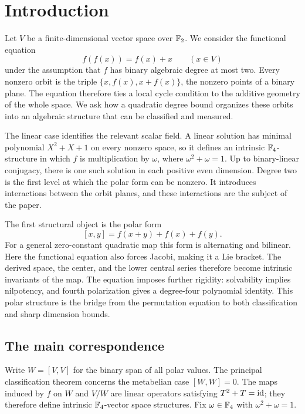 \section{Introduction}
\label{sec:introduction}

Let \(V\) be a finite-dimensional vector space over \(\mathbb F_2\). We consider
the functional equation
\begin{equation}\label{eq:functional}
 f(f(x))=f(x)+x\qquad(x\in V)
\end{equation}
under the assumption that \(f\) has binary algebraic degree at most two.
Every nonzero orbit is the triple \(\{x,f(x),x+f(x)\}\), the nonzero
points of a binary plane. The equation therefore ties a local cycle
condition to the additive geometry of the whole space. We ask how a
quadratic degree bound organizes these orbits into an algebraic structure
that can be classified and measured.

The linear case identifies the relevant scalar field. A linear solution
has minimal polynomial \(X^2+X+1\) on every nonzero space, so it defines
an intrinsic \(\mathbb F_4\)-structure in which \(f\) is multiplication by
\(\omega\), where \(\omega^2+\omega=1\). Up to binary-linear conjugacy,
there is one such solution in each positive even dimension.
Degree two is the first level at which the polar form can be nonzero.
It introduces interactions between the orbit planes, and these
interactions are the subject of the paper.

The first structural object is the polar form
\[
 [x,y]=f(x+y)+f(x)+f(y).
\]
For a general zero-constant quadratic map this form is alternating and
bilinear. Here the functional equation also forces Jacobi, making it a
Lie bracket. The derived space, the center, and the lower central series
therefore become intrinsic invariants of the map. The equation imposes
further rigidity: solvability implies nilpotency, and fourth polarization
gives a degree-four polynomial identity. This polar structure is the
bridge from the permutation equation to both classification and sharp
dimension bounds.

\subsection{The main correspondence}

Write \(W=[V,V]\) for the binary span of all polar values.
The principal classification theorem concerns the metabelian case
\([W,W]=0\). The maps induced by \(f\) on \(W\) and \(V/W\) are linear
operators satisfying \(T^2+T=\operatorname{id}\); they therefore define intrinsic
\(\mathbb F_4\)-vector space structures. Fix
\(\omega\in\mathbb F_4\) with \(\omega^2+\omega=1\).


